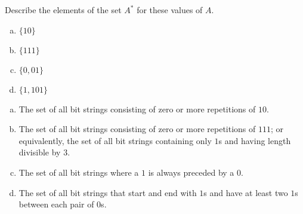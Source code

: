 \documentclass[../main.tex]{subfiles}
\begin{document}
Describe the elements of the set $A^\ast$ for these values of $A$.
\begin{enumerate}[a)]
	\item $\{10\}$
	\item $\{111\}$
	\item $\{0, 01\}$
	\item $\{1, 101\}$
\end{enumerate}

\solution
\begin{enumerate}[a)]
	\item The set of all bit strings consisting of zero or more repetitions of $10$.
	\item The set of all bit strings consisting of zero or more repetitions of $111$; or equivalently, the set of all bit strings containing only $1$s and having length divisible by $3$.
	\item The set of all bit strings where a $1$ is always preceded by a $0$.
	\item The set of all bit strings that start and end with $1$s and have at least two $1$s between each pair of $0$s.
\end{enumerate}
\end{document}
